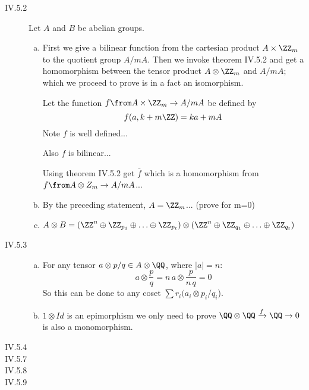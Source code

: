 \begin{description}
\item[IV.5.2] Let $A$ and $B$ be abelian groups.
\begin{enumerate}[(a)]
\item First we give a bilinear function from the cartesian product $A\times \ZZ_m$ to the quotient group $A/mA$. Then we invoke theorem IV.5.2 and get a homomorphism between the tensor product $A\otimes \ZZ_m$ and $A/mA$; which we proceed to prove is in a fact an isomorphism.

    Let the function $f\from A\times \ZZ_m\to A/mA$ be defined by $$f(a,k+m\ZZ) = ka+mA$$
    Note $f$ is well defined...

    Also $f$ is bilinear...

    Using theorem IV.5.2 get $\bar f$ which is a homomorphism from $f\from A\otimes Z_m \to A/mA$...
\item By the preceding statement, $A= \ZZ_m$... (prove for m=0)
\item $A\otimes B=(\ZZ^n\oplus\ZZ_{p_1}\oplus \ldots \oplus \ZZ_{p_t})\otimes(\ZZ^n\oplus\ZZ_{q_1}\oplus \ldots \oplus \ZZ_{q_t})$
\end{enumerate}
\item[IV.5.3]
    \begin{enumerate}[(a)]
        \item For any tensor $a\otimes p/q \in A\otimes \QQ$, where $|a|=n$:
            $$a\otimes \frac pq = n\,a\otimes \frac p{n\,q} = 0$$
            So this can be done to any coset $\sum r_i(a_i\otimes p_i/q_i$).
        \item $1\otimes Id $ is an epimorphism we only need to prove $\QQ\otimes \QQ \xrightarrow{f} \QQ \to 0$ is also a monomorphism.
    \end{enumerate}
\item[IV.5.4]
\item[IV.5.7]
\item[IV.5.8]
\item[IV.5.9]
\end{description}
